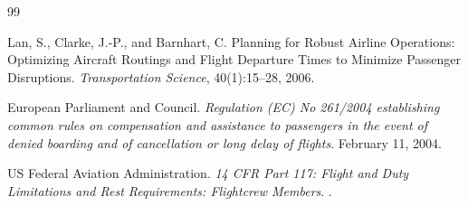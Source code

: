 \documentclass[11pt,a4paper]{article}
\theoremstyle{definition}
\theoremstyle{remark}
\begin{document}
\begin{thebibliography}{99}

Lan, S., Clarke, J.-P., and Barnhart, C.
\newblock Planning for Robust Airline Operations: Optimizing Aircraft
  Routings and Flight Departure Times to Minimize Passenger Disruptions.
\newblock \emph{Transportation Science}, 40(1):15--28, 2006.

European Parliament and Council.
\newblock \emph{Regulation (EC) No 261/2004 establishing common rules
  on compensation and assistance to passengers in the event of denied
  boarding and of cancellation or long delay of flights}.
\newblock February 11, 2004.

US Federal Aviation Administration.
\newblock \emph{14 CFR Part 117: Flight and Duty Limitations and Rest
  Requirements: Flightcrew Members}.
.

\end{thebibliography}
\end{document}
